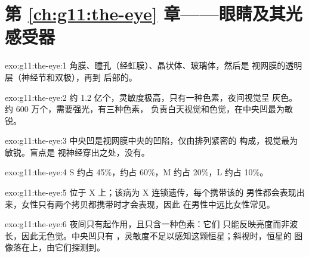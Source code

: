 \section*{第 \ref{ch:g11:the-eye} 章——眼睛及其光感受器}

\begin{solution}{exo:g11:the-eye:1}
角膜、瞳孔（经虹膜）、晶状体、玻璃体，然后是
视网膜的透明层（神经节和双极），再到
后部的。
\end{solution}

\begin{solution}{exo:g11:the-eye:2}
约 1.2 亿个，灵敏度极高，只有一种色素，夜间视觉呈
灰色。约 600 万个，需要强光，有三种色素，
负责白天视觉和色觉，在中央凹最为敏锐。
\end{solution}

\begin{solution}{exo:g11:the-eye:3}
中央凹是视网膜中央的凹陷，仅由排列紧密的
构成，视觉最为敏锐。盲点是
视神经穿出之处，没有。
\end{solution}

\begin{solution}{exo:g11:the-eye:4}
S 约占 45\%，约占 60\%，M 约占 20\%，L
约占 10\%。
\end{solution}

\begin{solution}{exo:g11:the-eye:5}
位于 X 上；该病为 X 连锁遗传，每个携带该的
男性都会表现出来，女性只有两个拷贝都携带时才会表现，因此
在男性中远比女性常见。
\end{solution}

\begin{solution}{exo:g11:the-eye:6}
夜间只有起作用，且只含一种色素：它们
只能反映亮度而非波长，因此无色觉。中央凹只有
，灵敏度不足以感知这颗恒星；斜视时，恒星的
图像落在上，由它们探测到。
\end{solution}

